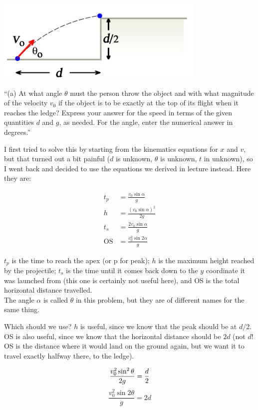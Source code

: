 \documentclass[12pt,a4paper]{report}
\begin{document}
\begin{center}
\includegraphics[scale=0.6]{Graphics/h2p3_1}
\end{center}

``(a) At what angle $\theta$ must the person throw the object and with what magnitude of the velocity $v_0$ if the object is to be exactly at the top of its flight when it reaches the ledge? Express your answer for the speed in terms of the given quantities $d$ and $g$, as needed. For the angle, enter the numerical answer in degrees.''

I first tried to solve this by starting from the kinematics equations for $x$ and $v$, but that turned out a bit painful ($d$ is unknown, $\theta$ is unknown, $t$ in unknown), so I went back and decided to use the equations we derived in lecture instead. Here they are:

\begin{align}
t_p &= \frac{v_0 \sin \alpha}{g}\\
h &= \frac{(v_0 \sin \alpha)^2}{2g}\\
t_s &= \frac{2 v_0 \sin \alpha}{g}\\
\text{OS} &= \frac{v_0^2 \sin 2\alpha}{g}
\end{align}

$t_p$ is the time to reach the apex (or p for peak); $h$ is the maximum height reached by the projectile; $t_s$ is the time until it comes back down to the $y$ coordinate it was launched from (this one is certainly not useful here), and OS is the total horizontal distance travelled.\\
The angle $\alpha$ is called $\theta$ in this problem, but they are of different names for the same thing.

Which should we use? $h$ is useful, since we know that the peak should be at $d/2$. OS is also useful, since we know that the horizontal distance should be $2d$ (not $d$! OS is the distance where it would land on the ground again, but we want it to travel exactly halfway there, to the ledge).

\begin{equation}
\frac{v_0^2 \sin^2 \theta}{2g} = \frac{d}{2}\\
\end{equation}
\begin{equation}
\frac{v_0^2 \sin 2\theta}{g} = 2d
\end{equation}
\end{document}
